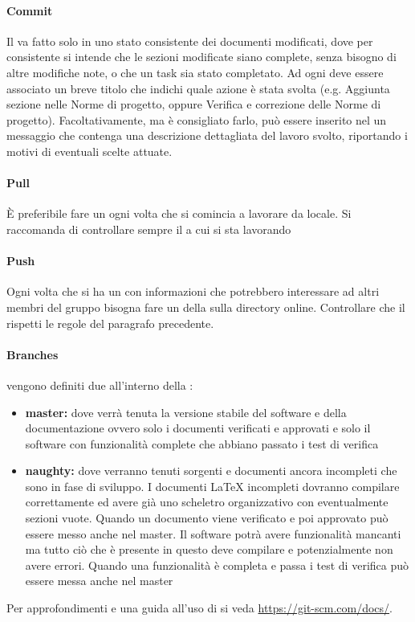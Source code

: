 \documentclass[12pt,a4paper]{article}
\begin{document}
\paragraph{Commit}
Il  va fatto solo in uno stato consistente dei documenti modificati, dove per consistente si intende che le sezioni modificate siano complete, senza bisogno di altre modifiche note, o che un task sia stato completato. Ad ogni  deve essere associato un breve titolo che indichi quale azione è stata svolta (e.g. Aggiunta sezione  nelle Norme di progetto, oppure Verifica e correzione delle Norme di progetto). Facoltativamente, ma è consigliato farlo, può essere inserito nel  un messaggio che contenga una descrizione dettagliata del lavoro svolto, riportando i motivi di eventuali scelte attuate.
\paragraph{Pull}
È preferibile fare un  ogni volta che si comincia a lavorare da locale. Si raccomanda di controllare sempre il  a cui si sta lavorando
\paragraph{Push}
Ogni volta che si ha un  con informazioni che potrebbero interessare ad altri membri del gruppo bisogna fare un  della  sulla directory online. Controllare che il  rispetti le regole del paragrafo precedente.

\paragraph{Branches} vengono definiti due  all'interno della :
\begin{itemize}
	\item \textbf{master:} dove verrà tenuta la versione stabile del software e della documentazione ovvero solo i documenti verificati e  approvati e solo il software con funzionalità complete che abbiano passato i test di verifica
	\item \textbf{naughty:} dove verranno tenuti sorgenti e documenti ancora incompleti che sono in fase di sviluppo. I documenti \LaTeX{} incompleti dovranno compilare correttamente ed avere già uno scheletro organizzativo con eventualmente sezioni vuote. Quando un documento viene verificato e poi approvato può essere messo anche nel  master. Il software potrà avere funzionalità mancanti ma tutto ciò che è presente in questo  deve compilare e potenzialmente non avere errori. Quando una funzionalità è completa e passa i test di verifica può essere messa anche nel  master
\end{itemize}
Per approfondimenti e una guida all'uso di  si veda \url{https://git-scm.com/docs/}.
\end{document}
